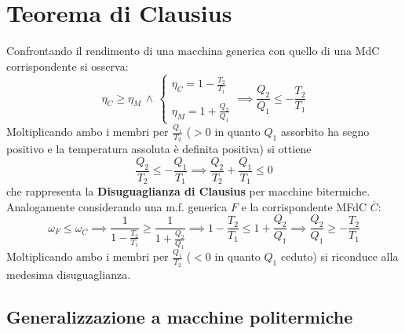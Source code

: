 \documentclass[10pt, oneside]{book}
\newcommand{\ds}{\displaystyle}
\begin{document}
\section{Teorema di Clausius}
Confrontando il rendimento di una macchina generica con quello di una MdC corrispondente si osserva:
\[\eta_C \geq \eta_M \, \land \, \begin{cases} \displaystyle \eta_C = 1 - \frac{T_2}{T_1} \\ \\ \displaystyle \eta_M = 1 + \frac{Q_2}{Q_1}
\end{cases} \implies \frac{Q_2}{Q_1} \leq - \frac{T_2}{T_1}\] 
Moltiplicando ambo i membri per $\ds \frac{Q_1}{T_2}$ ($> 0$ in quanto $Q_1$ assorbito ha segno positivo e la temperatura assoluta è definita positiva) si ottiene
\[\frac{Q_2}{T_2} \leq - \frac{Q_1}{T_1} \implies \boxed{\frac{Q_2}{T_2} + \frac{Q_1}{T_1} \leq 0}\]
che rappresenta la \textbf{Disuguaglianza di Clausius} per macchine bitermiche.\\
Analogamente considerando una m.f. generica $F$ e la corrispondente MFdC $\overline{C}$:
\[\omega_F \leq \omega_{\overline{C}} \implies \frac{1}{1 - \frac{T_2}{T_1}} \geq \frac{1}{1 + \frac{Q_2}{Q_1}} \implies 1 - \frac{T_2}{T_1} \leq 1 + \frac{Q_2}{Q_1} \implies \frac{Q_2}{Q_1} \geq - \frac{T_2}{T_1}\]
Moltiplicando ambo i membri per $\ds \frac{Q_1}{T_2}$ ($< 0$ in quanto $Q_1$ ceduto) si riconduce alla medesima disuguaglianza.

\subsection{Generalizzazione a macchine politermiche}
\end{document}
